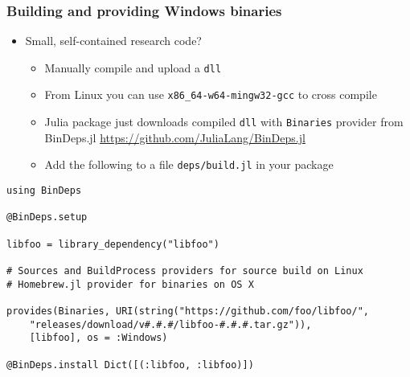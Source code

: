 \documentclass[compressed,dvips,letter]{beamer}
\begin{document}
\begin{frame}[fragile]\frametitle{Building and providing Windows binaries}

\begin{itemize}
  \item Small, self-contained research code?
  \begin{itemize}
    \item Manually compile and upload a \texttt{dll}
    \item From Linux you can use \texttt{x86\_64-w64-mingw32-gcc} to cross compile
    \item Julia package just downloads compiled \texttt{dll} with \texttt{Binaries} provider from BinDeps.jl \url{https://github.com/JuliaLang/BinDeps.jl}
    \item Add the following to a file \texttt{deps/build.jl} in your package
  \end{itemize}
\end{itemize}
{\scriptsize
\begin{verbatim}
using BinDeps

@BinDeps.setup

libfoo = library_dependency("libfoo")

# Sources and BuildProcess providers for source build on Linux
# Homebrew.jl provider for binaries on OS X

provides(Binaries, URI(string("https://github.com/foo/libfoo/",
    "releases/download/v#.#.#/libfoo-#.#.#.tar.gz")),
    [libfoo], os = :Windows)

@BinDeps.install Dict([(:libfoo, :libfoo)])
\end{verbatim}
}
\end{frame}
%
%
\end{document}
